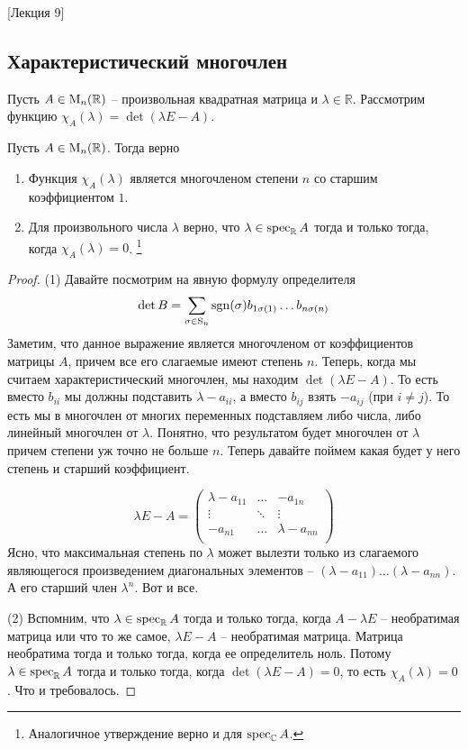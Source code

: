 [Лекция 9]


\subsection{Характеристический многочлен}

Пусть $A\in\operatorname{M}_{n}(\mathbb R)$ -- произвольная квадратная матрица и $\lambda \in\mathbb R$.
Рассмотрим функцию $\chi_A(\lambda) = \det(\lambda E - A)$.

\begin{claim}
\label{claim::CharSpec}
Пусть $A\in\operatorname{M}_{n}(\mathbb R)$.
Тогда верно
\begin{enumerate}
\item Функция $\chi_A(\lambda)$ является многочленом степени $n$ со старшим коэффициентом $1$.

\item Для произвольного числа $\lambda$ верно, что $\lambda \in\operatorname{spec}_\mathbb R A$ тогда и только тогда, когда $\chi_A(\lambda) = 0$.%
\footnote{Аналогичное утверждение верно и для $\operatorname{spec}_\mathbb C A$.}
\end{enumerate}
\end{claim}
\begin{proof}
(1) Давайте посмотрим на явную формулу определителя
\[
\det B = \sum_{\sigma\in\operatorname{S}_{n}}\operatorname{sgn}(\sigma) b_{1\sigma(1)}\ldots b_{n\sigma(n)}
\]
Заметим, что данное выражение является многочленом от коэффициентов матрицы $A$, причем все его слагаемые имеют степень $n$.
Теперь, когда мы считаем характеристический многочлен, мы находим $\det(\lambda E - A)$.
То есть вместо $b_{ii}$ мы должны подставить  $\lambda - a_{ii}$, а вместо $b_{ij}$ взять $-a_{ij}$ (при $i\neq j$).
То есть мы в многочлен от многих переменных подставляем либо числа, либо линейный многочлен от $\lambda$.
Понятно, что результатом будет многочлен от $\lambda$ причем степени уж точно не больше $n$.
Теперь давайте поймем какая будет у него степень и старший коэффициент.

\[
\lambda E - A = 
\begin{pmatrix}
{\lambda - a_{11}}&{\ldots}&{-a_{1n}}\\
{\vdots}&{\ddots}&{\vdots}\\
{-a_{n1}}&{\ldots}&{\lambda - a_{nn}}\\
\end{pmatrix}
\]
Ясно, что максимальная степень по $\lambda$ может вылезти только из слагаемого являющегося произведением диагональных элементов -- $(\lambda - a_{11}) \ldots (\lambda - a_{nn})$.
А его старший член $\lambda^n$.
Вот и все.

(2) Вспомним, что $\lambda\in\operatorname{spec}_\mathbb R A$ тогда и только тогда, когда $A - \lambda E$ -- необратимая матрица или что то же самое,  $\lambda E - A$ -- необратимая матрица.
Матрица необратима тогда и только тогда, когда ее определитель ноль.
Потому $\lambda \in\operatorname{spec}_\mathbb R A$ тогда и только тогда, когда $\det (\lambda E - A) = 0$, то есть $\chi_A(\lambda) = 0$.
Что и требовалось.
\end{proof}

